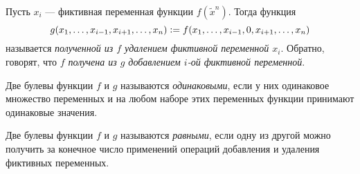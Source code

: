 \begin{definition}
    Пусть $x_i$ --- фиктивная переменная функции $f(\widetilde{x}^n)$. Тогда функция \[g(x_1, \ldots, x_{i - 1}, x_{i + 1}, \ldots, x_n) \vcentcolon = f(x_1, \ldots, x_{i - 1}, 0, x_{i + 1}, \ldots, x_n)\]
    называется \textit{полученной из $f$ удалением фиктивной переменной $x_i$}. Обратно, говорят, что \textit{$f$ получена из $g$ добавлением $i$-ой фиктивной переменной}.
\end{definition}

\begin{definition}
    Две булевы функции $f$ и $g$ называются \textit{одинаковыми}, если у них одинаковое множество переменных и на любом наборе этих переменных функции принимают одинаковые значения.
\end{definition}

\begin{definition}
    Две булевы функции $f$ и $g$ называются \textit{равными}, если одну из другой можно получить за конечное число применений операций добавления и удаления фиктивных переменных.
\end{definition}


